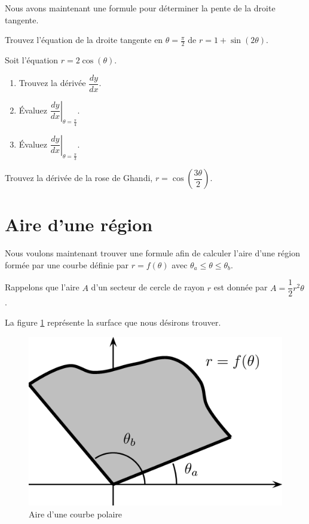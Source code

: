 \documentclass[]{book}
\providecommand{\tightlist}{%
  \setlength{\itemsep}{0pt}\setlength{\parskip}{0pt}}
\theoremstyle{definition}
\theoremstyle{definition}
\theoremstyle{definition}
\theoremstyle{remark}
\let\BeginKnitrBlock\begin \let\EndKnitrBlock\end
\begin{document}
Nous avons maintenant une formule pour déterminer la pente de la droite
tangente.

\BeginKnitrBlock{example}
\protect\hypertarget{exm:unnamed-chunk-105}{}{\label{exm:unnamed-chunk-105}
}Trouvez l'équation de la droite tangente en \(\theta=\frac{\pi}{2}\) de
\(r=1+\sin(2\theta)\).
\EndKnitrBlock{example}
\vspace*{8cm}

\BeginKnitrBlock{example}
\protect\hypertarget{exm:unnamed-chunk-106}{}{\label{exm:unnamed-chunk-106}
}Soit l'équation \(r=2\cos(\theta)\).

\begin{enumerate}
\def\labelenumi{\alph{enumi}.}
\tightlist
\item
  Trouvez la dérivée \(\dfrac{dy}{dx}\).
\item
  Évaluez \(\left.\dfrac{dy}{dx}\right|_{\theta=\frac{\pi}{4}}\).
\item
  Évaluez \(\left.\dfrac{dy}{dx}\right|_{\theta=\frac{\pi}{3}}\).
\end{enumerate}
\EndKnitrBlock{example}
\vspace*{10cm}

\BeginKnitrBlock{example}
\protect\hypertarget{exm:unnamed-chunk-107}{}{\label{exm:unnamed-chunk-107}
}Trouvez la dérivée de la rose de Ghandi,
\(r=\cos\left(\dfrac{3\theta}{2}\right)\).
\EndKnitrBlock{example}
\vspace*{6cm}

\hypertarget{aire-dune-region}{%
\section{Aire d'une région}\label{aire-dune-region}}

Nous voulons maintenant trouver une formule afin de calculer l'aire
d'une région formée par une courbe définie par \(r=f(\theta)\) avec
\(\theta_a\leq \theta \leq \theta_b\).

Rappelons que l'aire \(A\) d'un secteur de cercle de rayon \(r\) est
donnée par \(A=\dfrac{1}{2}r^2\theta\).

La figure \ref{fig:airepolaire1} représente la surface que nous désirons
trouver.

\begin{figure}

{\centering \includegraphics[width=0.5\linewidth]{resources/images/latex/airepolaire1} 

}

\caption{Aire d'une courbe polaire}\label{fig:airepolaire1}
\end{figure}
\end{document}
